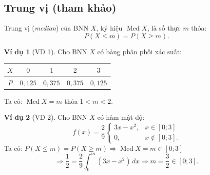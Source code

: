 \documentclass[12pt,a4paper]{article}
\theoremstyle{definition}
\newtheorem{vidu}{Ví dụ}[section]
\begin{document}
\subsection{Trung vị (tham khảo)}
Trung vị (\textit{median}) của BNN $X$, ký hiệu $\operatorname{Med} X$, là số thực $m$ thỏa:
\[
P(X \le m) = P(X \ge m).
\]

\begin{vidu}[VD 1]
Cho BNN $X$ có bảng phân phối xác suất:
\begin{center}
\begin{tabular}{|c|c|c|c|c|}
\hline
$X$ & $0$ & $1$ & $2$ & $3$ \\
\hline
$P$ & $0{,}125$ & $0{,}375$ & $0{,}375$ & $0{,}125$ \\
\hline
\end{tabular}
\end{center}
Ta có: $\operatorname{Med} X = m$ thỏa $1 < m < 2$.
\end{vidu}

\begin{vidu}[VD 2]
Cho BNN $X$ có hàm mật độ:
\[
f(x) = \frac{2}{9} \begin{cases}
3x - x^2, & x \in [0; 3] \\
0, & x \notin [0; 3].
\end{cases}
\]
Ta có: $P(X \le m) = P(X \ge m) \Rightarrow \operatorname{Med} X = m \in [0; 3]$
\[
\Rightarrow \frac{1}{2} = \frac{2}{9} \int_0^m (3x - x^2)\,dx \Rightarrow m = \frac{3}{2} \in [0; 3].
\]
\end{vidu}
\end{document}
